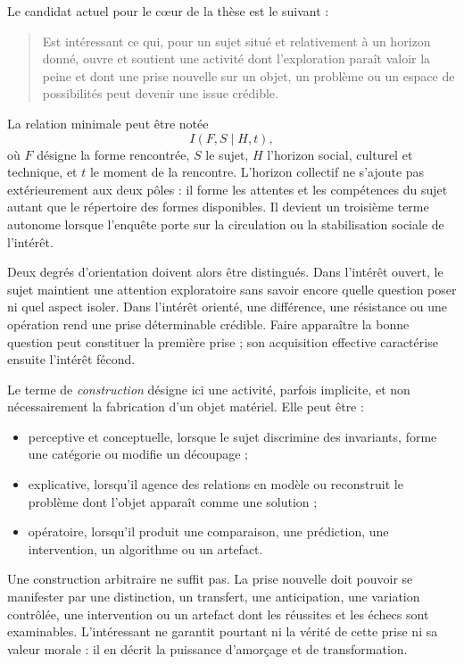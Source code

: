 \documentclass[11pt,a4paper]{article}
\begin{document}
Le candidat actuel pour le cœur de la thèse est le suivant :

\begin{quote}
Est intéressant ce qui, pour un sujet situé et relativement à un horizon donné,
ouvre et soutient une activité dont l'exploration paraît valoir la peine et dont
une prise nouvelle sur un objet, un problème ou un espace de possibilités peut
devenir une issue crédible.
\end{quote}

La relation minimale peut être notée
\[
  I(F,S\mid H,t),
\]
où \(F\) désigne la forme rencontrée, \(S\) le sujet, \(H\) l'horizon social,
culturel et technique, et \(t\) le moment de la rencontre. L'horizon collectif
ne s'ajoute pas extérieurement aux deux pôles : il forme les attentes et les
compétences du sujet autant que le répertoire des formes disponibles. Il devient
un troisième terme autonome lorsque l'enquête porte sur la circulation ou la
stabilisation sociale de l'intérêt.

Deux degrés d'orientation doivent alors être distingués. Dans l'intérêt ouvert,
le sujet maintient une attention exploratoire sans savoir encore quelle question
poser ni quel aspect isoler. Dans l'intérêt orienté, une différence, une
résistance ou une opération rend une prise déterminable crédible. Faire
apparaître la bonne question peut constituer la première prise ; son acquisition
effective caractérise ensuite l'intérêt fécond.

Le terme de \emph{construction} désigne ici une activité, parfois implicite, et
non nécessairement la fabrication d'un objet matériel. Elle peut être :

\begin{itemize}
  \item perceptive et conceptuelle, lorsque le sujet discrimine des invariants,
        forme une catégorie ou modifie un découpage ;
  \item explicative, lorsqu'il agence des relations en modèle ou reconstruit le
        problème dont l'objet apparaît comme une solution ;
  \item opératoire, lorsqu'il produit une comparaison, une prédiction, une
        intervention, un algorithme ou un artefact.
\end{itemize}

Une construction arbitraire ne suffit pas. La prise nouvelle doit pouvoir se
manifester par une distinction, un transfert, une anticipation, une variation
contrôlée, une intervention ou un artefact dont les réussites et les échecs sont
examinables. L'intéressant ne garantit pourtant ni la vérité de cette prise ni
sa valeur morale : il en décrit la puissance d'amorçage et de transformation.
\end{document}
